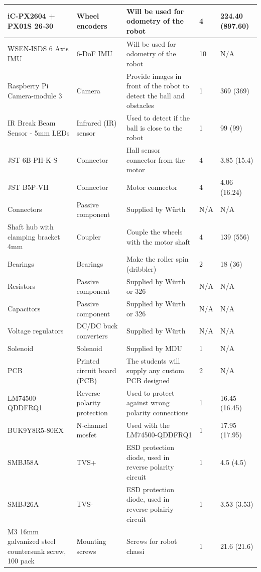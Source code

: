 \documentclass[a4paper,8pt]{article}
\begin{document}
\begin{center}
\begin{longtable}{|p{3cm}|p{3cm}|p{3cm}|p{1cm}|p{3cm}| }
      iC-PX2604 + PX01S 26-30 & Wheel encoders & Will be used for odometry of the robot & 4 & 224.40 (897.60) \\ \hline 
      WSEN-ISDS 6 Axis IMU & 6-DoF IMU & Will be used for odometry of the robot & 10 & N/A\\ \hline 
      Raspberry Pi Camera-module 3 & Camera & Provide images in front of the robot to detect the ball and obstacles & 1 & 369 (369) \\ \hline 
      IR Break Beam Sensor - 5mm LEDs & Infrared (IR) sensor & Used to detect if the ball is close to the robot & 1 & 99 (99) \\ \hline 
      JST 6B-PH-K-S & Connector & Hall sensor connector from the motor & 4 & 3.85 (15.4) \\ \hline 
      JST B5P-VH & Connector & Motor connector & 4 & 4.06 (16.24) \\ \hline 
      Connectors & Passive component & Supplied by Würth & N/A & N/A \\ \hline 
      Shaft hub with clamping bracket 4mm & Coupler & Couple the wheels with the motor shaft & 4 & 139 (556) \\ \hline 
      Bearings & Bearings & Make the roller spin (dribbler) & 2 & 18 (36)\\ \hline 
      Resistors & Passive component & Supplied by Würth or 326 & N/A & N/A \\ \hline 
      Capacitors & Passive component & Supplied by Würth or 326 & N/A & N/A \\ \hline 
      Voltage regulators & DC/DC buck converters & Supplied by Würth & N/A & N/A \\ \hline 
      Solenoid & Solenoid & Supplied by MDU & 1 & N/A \\ \hline 
      PCB & Printed circuit board (PCB) & The students will supply any custom PCB designed & 2 & N/A\\ \hline
      LM74500\break-QDDFRQ1 & Reverse polarity protection & Used to
      protect against wrong polarity connections & 1 & 16.45 (16.45) \\ \hline 
      BUK9Y8R5-80EX & N-channel mosfet & Used with the LM74500\break-QDDFRQ1 & 1 & 17.95 (17.95) \\ \hline 
      SMBJ58A & TVS+ & ESD protection diode, used in reverse polarity circuit & 1 & 4.5 (4.5) \\ \hline 
      SMBJ26A & TVS- & ESD protection diode, used in reverse polairiy circuit & 1 & 3.53 (3.53) \\ \hline
      M3 16mm galvanized steel countersunk screw, 100 pack & Mounting screws & Screws for robot chassi & 1 & 21.6 (21.6) \\ \hline

\end{longtable}
\end{center}
\end{document}
